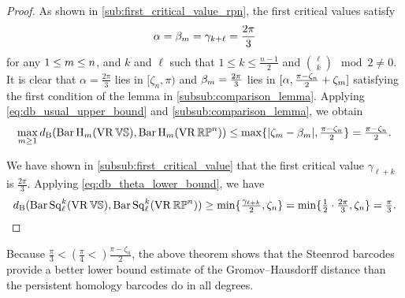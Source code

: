 \begin{proof}
	As shown in \cref{sub:first_critical_value_rpn}, the first critical values satisfy
	$$
	\alpha = \beta_m = \gamma_{k+\ell} = \frac{2\pi}{3}
	$$
	for any $1 \leq m \leq n$, and $k$ and $\ell$ such that $1\leq k \leq \frac{n-1}{2}$ and $\binom{\ell}{k} \mod 2 \neq 0$.
	It is clear that $\alpha= \tfrac{2\pi}{3}$ lies in $[\zeta_n, \pi)$ and $\beta_m = \tfrac{2\pi}{3}$ lies in $[\alpha, \tfrac{\pi - \zeta_n}{2}+\zeta_m]$ satisfying the first condition of the lemma in \cref{subsub:comparison_lemma}.
	Applying \cref{eq:db_usual_upper_bound} and \cref{subsub:comparison_lemma}, we obtain
	\[\max_{m\geq 1}d_{\mathrm{B}}(\operatorname{Bar} \operatorname{H}_{m}(\operatorname{VR} \mathbb{V}\mathbb{S}), \operatorname{Bar} \operatorname{H}_{m}(\operatorname{VR} \mathbb{RP}^n))
    \leq \max\{|\zeta_m  - \beta_m |, \tfrac{\pi - \zeta_n}{2}\}
    = \tfrac{\pi - \zeta_n}{2}.\]

	We have shown in \cref{subsub:first_critical_value} that the first critical value $\gamma_{\ell+k}$ is $\tfrac{2\pi}{3}$.
	Applying \cref{eq:db_theta_lower_bound}, we have
	\[d_{\mathrm{B}}(\operatorname{Bar}\operatorname{Sq}^{k}_{\ell}(\operatorname{VR} \mathbb{V}\mathbb{S}), \operatorname{Bar}\operatorname{Sq}^{k}_{\ell}(\operatorname{VR} \mathbb{RP}^n))
	\geq \min\{\tfrac{\gamma_{\ell+k}}{2}, \zeta_n\}
	= \min\{\tfrac{1}{2}\cdot\tfrac{2\pi}{3}, \zeta_n\}
	= \tfrac{\pi}{3}.\qedhere
\]
\end{proof}

Because $\tfrac{\pi}{3} < (\tfrac{\pi}{4} <) \tfrac{\pi - \zeta_n}{2}$, the above theorem shows that the Steenrod barcodes provide a better lower bound estimate of the Gromov--Hausdorff distance than the persistent homology barcodes do in all degrees.